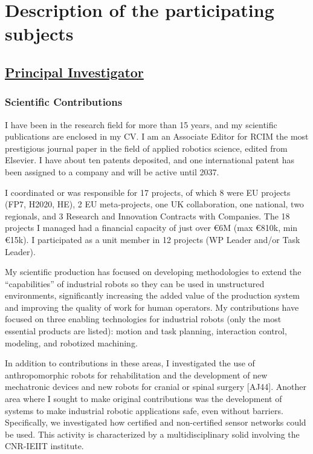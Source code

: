 
\section{\texorpdfstring{Description of the participating subjects
}{Description of the participating subjects }}\label{description-of-the-participating-subjects}

\subsection{\texorpdfstring{\ul{Principal
Investigator}}{Principal Investigator}}\label{principal-investigator}

\subsubsection{Scientific Contributions}\label{scientific-contributions}

I have been in the research field for more than 15 years, and my
scientific publications are enclosed in my CV. I am an Associate Editor
for RCIM the most prestigious journal paper in the field of applied
robotics science, edited from Elsevier. I have about ten patents
deposited, and one international patent has been assigned to a company
and will be active until 2037.

I coordinated or was responsible for 17 projects, of which 8 were EU
projects (FP7, H2020, HE), 2 EU meta-projects, one UK collaboration, one
national, two regionals, and 3 Research and Innovation Contracts with
Companies. The 18 projects I managed had a financial capacity of just
over €6M (max €810k, min €15k). I participated as a unit member in 12
projects (WP Leader and/or Task Leader).

My scientific production has focused on developing methodologies to
extend the ``capabilities'' of industrial robots so they can be used in
unstructured environments, significantly increasing the added value of
the production system and improving the quality of work for human
operators. My contributions have focused on three enabling technologies
for industrial robots (only the most essential products are listed):
motion and task planning, interaction control, modeling, and robotized
machining.

In addition to contributions in these areas, I investigated the use of
anthropomorphic robots for rehabilitation and the development of new
mechatronic devices and new robots for cranial or spinal surgery
{[}AJ44{]}. Another area where I sought to make original contributions
was the development of systems to make industrial robotic applications
safe, even without barriers. Specifically, we investigated how certified
and non-certified sensor networks could be used. This activity is
characterized by a multidisciplinary solid involving the CNR-IEIIT
institute.

